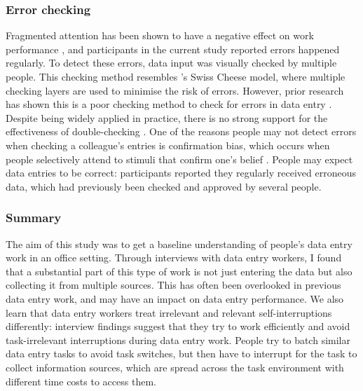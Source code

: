 \subsubsection{Error checking}
Fragmented attention has been shown to have a negative effect on work performance \citep{Bailey2001, Carrier2015}, and participants in the current study reported errors happened regularly. To detect these errors, data input was visually checked by multiple people. This checking method resembles \citeauthor{Reason1990}'s \citeyearpar{Reason1990}  Swiss Cheese model, where multiple checking layers are used to minimise the risk of errors. However, prior research has shown this is a poor checking method to check for errors in data entry \citep{Olsen2008, Wiseman2013a}. Despite being widely applied in practice, there is no strong support for the effectiveness of double-checking \citep{Li2016}. One of the reasons people may not detect errors when checking a colleague's entries is confirmation bias, which occurs when people selectively attend to stimuli that confirm one's belief \citep{Lewis1986}. People may expect data entries to be correct: participants reported they regularly received erroneous data, which had previously been checked and approved by several people. 


\subsubsection{Summary}
The aim of this study was to get a baseline understanding of people's data entry work in an office setting. Through interviews with data entry workers, I found that a substantial part of this type of work is not just entering the data but also collecting it from multiple sources. This has often been overlooked in previous data entry work, and may have an impact on data entry performance. We also learn that data entry workers treat irrelevant and relevant self-interruptions differently: interview findings suggest that they try to work efficiently and avoid task-irrelevant interruptions during data entry work. People try to batch similar data entry tasks to avoid task switches, but then have to interrupt for the task to collect information sources, which are spread across the task environment with different time costs to access them. 

